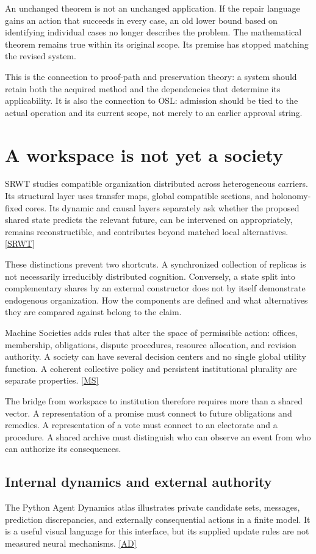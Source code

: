 \documentclass[11pt,oneside]{article}
\newcommand{\src}[1]{\hyperlink{cat:#1}{\textsf{[#1]}}}
\begin{document}
An unchanged theorem is not an unchanged application. If the repair language gains an action that succeeds in every case, an old lower bound based on identifying individual cases no longer describes the problem. The mathematical theorem remains true within its original scope. Its premise has stopped matching the revised system.

This is the connection to proof-path and preservation theory: a system should retain both the acquired method and the dependencies that determine its applicability. It is also the connection to OSL: admission should be tied to the actual operation and its current scope, not merely to an earlier approval string.

\section{A workspace is not yet a society}
SRWT studies compatible organization distributed across heterogeneous carriers. Its structural layer uses transfer maps, global compatible sections, and holonomy-fixed cores. Its dynamic and causal layers separately ask whether the proposed shared state predicts the relevant future, can be intervened on appropriately, remains reconstructible, and contributes beyond matched local alternatives. \src{SRWT}

These distinctions prevent two shortcuts. A synchronized collection of replicas is not necessarily irreducibly distributed cognition. Conversely, a state split into complementary shares by an external constructor does not by itself demonstrate endogenous organization. How the components are defined and what alternatives they are compared against belong to the claim.

Machine Societies adds rules that alter the space of permissible action: offices, membership, obligations, dispute procedures, resource allocation, and revision authority. A society can have several decision centers and no single global utility function. A coherent collective policy and persistent institutional plurality are separate properties. \src{MS}

The bridge from workspace to institution therefore requires more than a shared vector. A representation of a promise must connect to future obligations and remedies. A representation of a vote must connect to an electorate and a procedure. A shared archive must distinguish who can observe an event from who can authorize its consequences.

\subsection{Internal dynamics and external authority}
The Python Agent Dynamics atlas illustrates private candidate sets, messages, prediction discrepancies, and externally consequential actions in a finite model. It is a useful visual language for this interface, but its supplied update rules are not measured neural mechanisms. \src{AD}
\end{document}

